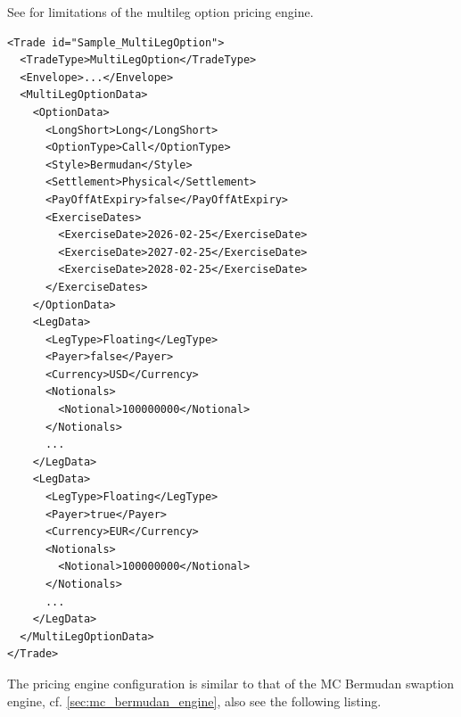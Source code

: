 See \cite{methods} for limitations of the multileg option pricing engine.

\begin{verbatim}
<Trade id="Sample_MultiLegOption">
  <TradeType>MultiLegOption</TradeType>
  <Envelope>...</Envelope>
  <MultiLegOptionData>
    <OptionData>
      <LongShort>Long</LongShort>
      <OptionType>Call</OptionType>
      <Style>Bermudan</Style>
      <Settlement>Physical</Settlement>
      <PayOffAtExpiry>false</PayOffAtExpiry>
      <ExerciseDates>
        <ExerciseDate>2026-02-25</ExerciseDate>
        <ExerciseDate>2027-02-25</ExerciseDate>
        <ExerciseDate>2028-02-25</ExerciseDate>
      </ExerciseDates>
    </OptionData>
    <LegData>
      <LegType>Floating</LegType>
      <Payer>false</Payer>
      <Currency>USD</Currency>
      <Notionals>
        <Notional>100000000</Notional>
      </Notionals>
      ...
    </LegData>
    <LegData>
      <LegType>Floating</LegType>
      <Payer>true</Payer>
      <Currency>EUR</Currency>
      <Notionals>
        <Notional>100000000</Notional>
      </Notionals>
      ...
    </LegData>
  </MultiLegOptionData>
</Trade>
\end{verbatim}

The pricing engine configuration is similar to that of the MC Bermudan swaption engine, cf.
\ref{sec:mc_bermudan_engine}, also see the following listing.

